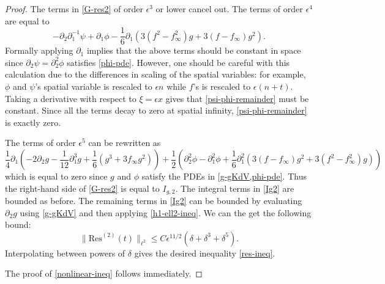 \begin{proof}
	The terms in \cref{G-res2} of order \(\epsilon^3\) or lower cancel out. The terms of order \(\epsilon^4\) are equal to 
	\begin{equation}\label{psi-phi-remainder}
		-\partial_2 \partial_1^{-1} \psi+ \partial_1 \phi  - \frac 1 6 \partial_1(3(f^2 - f_\infty^2) g + 3(f-f_\infty) g^2).
	\end{equation}
	Formally applying \(\partial_1\) implies that the above terms should be constant in space since \(\partial_2 \psi = \partial_2^2 \phi\) satisfies \cref{phi-pde}. However, one should be careful with this calculation due to the differences in scaling of the spatial variables: for example, \(\phi\) and \(\psi\)'s spatial variable is rescaled to \(\epsilon n\) while \(f\)'s is rescaled to \(\epsilon(n+t)\). Taking a derivative with respect to \(\xi = \epsilon x\) gives that \cref{psi-phi-remainder} must be constant. Since all the terms decay to zero at spatial infinity, \cref{psi-phi-remainder} is exactly zero.
	
	The terms of order \(\epsilon^5\) can be rewritten as
	\begin{equation*}
		\frac 1 4 \partial_1( - 2 \partial_2 g - \frac 1 {12} \partial_1^3 g + \frac 1 6 (g^3 + 3f_\infty g^2)) + \frac 1 2 (\partial_2^2\phi - \partial_1^2\phi + \frac 1 6 \partial_1^2(3(f-f_\infty )g^2 + 3 (f^2-f_\infty^2)g))
	\end{equation*}
	which is equal to zero since \(g\) and \(\phi\) satisfy the PDEs in \cref{g-gKdV,phi-pde}. Thus the right-hand side of \cref{G-res2} is equal to \(I_{g,2}\). The integral terms in \cref{Ig2} are bounded as before. The remaining terms in \cref{Ig2} can be bounded by evaluating \(\partial_2 g\) using \cref{g-gKdV} and then applying \cref{h1-ell2-ineq}. We can the get the following bound: \[\| \mathrm{Res}^{(2)}(t) \|_{\ell^2} \leq C \epsilon^{11/2} (\delta + \delta^3 + \delta^5).\] Interpolating between powers of \(\delta\) gives the desired inequality \cref{res-ineq}.
	
	The proof of \cref{nonlinear-ineq} follows immediately.
\end{proof}

